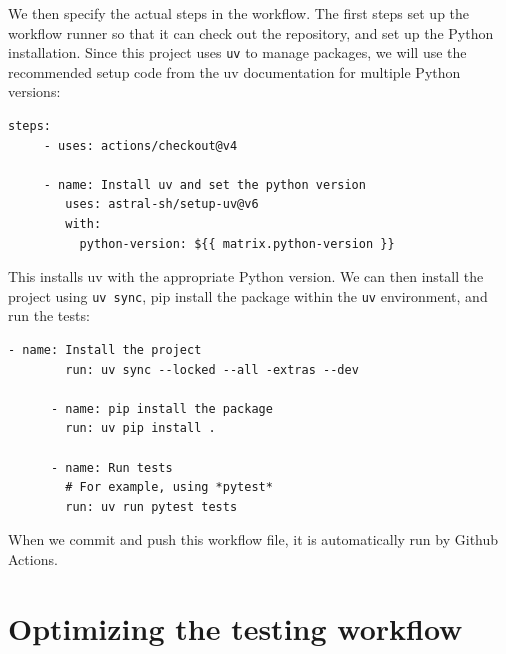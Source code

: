 We then specify the actual steps in the workflow.
The first steps set up the workflow runner so that it can check out the repository, and set up the Python installation.
Since this project uses \texttt{uv} to manage packages, we will use the recommended setup code from the uv documentation for multiple Python versions:

\begin{lstlisting}[style=yaml]
steps:
     - uses: actions/checkout@v4

     - name: Install uv and set the python version
        uses: astral-sh/setup-uv@v6
        with:
          python-version: ${{ matrix.python-version }}
\end{lstlisting}

This installs uv with the appropriate Python version.
We can then install the project using \texttt{uv sync}, pip install the package within the \texttt{uv} environment, and run the tests:

\begin{lstlisting}[style=yaml]
- name: Install the project
        run: uv sync --locked --all -extras --dev

      - name: pip install the package
        run: uv pip install .

      - name: Run tests
        # For example, using *pytest*
        run: uv run pytest tests
\end{lstlisting}

When we commit and push this workflow file, it is automatically run by Github Actions.






\section{Optimizing the testing workflow}

